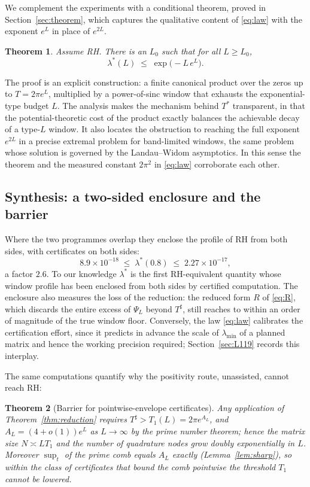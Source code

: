 ﻿\documentclass[11pt]{article}
\newtheorem{theorem}{Theorem}[section]
\newcommand{\lmin}{\lambda^{*}}
\newcommand{\lammin}{\lambda_{\min}}
\newcommand{\Tstar}{T^{*}}
\newcommand{\Tsharp}{T^{\sharp}}
\begin{document}
We complement the experiments with a conditional theorem, proved in
Section~\ref{sec:theorem}, which captures the qualitative content of
\eqref{eq:law} with the exponent $e^{L}$ in place of $e^{2L}$.

\begin{theorem}\label{thm:main-intro}
Assume RH.  There is an $L_0$ such that for all $L\ge L_0$,
\[
  \lmin(L)\;\le\;\exp\!\bigl(-L\,e^{L}\bigr).
\]
\end{theorem}

The proof is an explicit construction: a finite canonical product over
the zeros up to $T=2\pi e^{L}$, multiplied by a power-of-sinc window
that exhausts the exponential-type budget $L$.  The analysis makes the
mechanism behind $\Tstar$ transparent, in that the potential-theoretic
cost of the product exactly balances the achievable decay of a type-$L$
window.  It also locates the obstruction to reaching the full exponent
$e^{2L}$ in a precise extremal problem for band-limited windows, the
same problem whose solution is governed by the Landau--Widom
asymptotics.  In this sense the theorem and the measured constant
$2\pi^2$ in \eqref{eq:law} corroborate each other.

\subsection{Synthesis: a two-sided enclosure and the barrier}
\label{sec:intro-synthesis}

Where the two programmes overlap they enclose the profile of RH from
both sides, with certificates on both sides:
\[
  8.9\times10^{-18}\;\le\;\lmin(0.8)\;\le\;2.27\times10^{-17},
\]
a factor $2.6$.  To our knowledge $\lmin$ is the first RH-equivalent
quantity whose window profile has been enclosed from both sides by
certified computation.  The enclosure also measures the loss of the
reduction: the reduced form $R$ of \eqref{eq:R}, which discards the
entire excess of $\Psi_L$ beyond $\Tsharp$, still reaches to within an
order of magnitude of the true window floor.  Conversely, the law
\eqref{eq:law} calibrates the certification effort, since it predicts
in advance the scale of $\lammin$ of a planned matrix and hence the
working precision required; Section~\ref{sec:L119} records this
interplay.

The same computations quantify why the positivity route, unassisted,
cannot reach RH:

\begin{theorem}[Barrier for pointwise-envelope certificates]
\label{thm:barrier}
Any application of Theorem~\ref{thm:reduction} requires
$\Tsharp>T_1(L)=2\pi e^{A_L}$, and $A_L=(4+o(1))e^{L}$ as $L\to\infty$
by the prime number theorem; hence the matrix size $N\asymp LT_1$ and
the number of quadrature nodes grow doubly exponentially in $L$.
Moreover $\sup_t$ of the prime comb equals $A_L$ exactly
(Lemma~\ref{lem:sharp}), so within the class of certificates that bound
the comb pointwise the threshold $T_1$ cannot be lowered.
\end{theorem}
\end{document}

